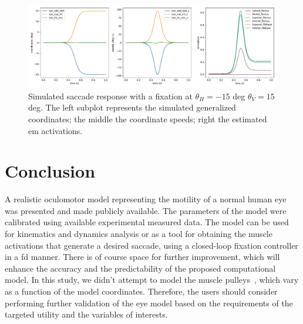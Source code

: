 \documentclass[11pt,a4paper,draft=false]{report}
\begin{document}
\begin{figure}[ht]
  \centering
  \includegraphics[width=1.\textwidth]{UPAT_Eye_Model_Passive_Pulleys_v3_States[-15][15].pdf}
  \caption{Simulated saccade response with a fixation at $\theta_H = -15$ deg
    $\theta_V = 15$ deg. The left subplot represents the simulated generalized
    coordinates; the middle the coordinate speeds; right the estimated \gls{em}
    activations.}\label{fig:simulated-saccade}
\end{figure}

\section*{Conclusion}\label{sec:concluison}

A realistic oculomotor model representing the motility of a normal human eye was
presented and made publicly available. The parameters of the model were
calibrated using available experimental measured data. The model can be used for
kinematics and dynamics analysis or as a tool for obtaining the muscle
activations that generate a desired saccade, using a closed-loop fixation
controller in a \gls{fd} manner. There is of course space for further
improvement, which will enhance the accuracy and the predictability of the
proposed computational model. In this study, we didn't attempt to model the
muscle pulleys~\cite{Kono2002a}, which vary as a function of the model
coordinates. Therefore, the users should consider performing further validation
of the eye model based on the requirements of the targeted utility and the
variables of interests.




\end{document}
